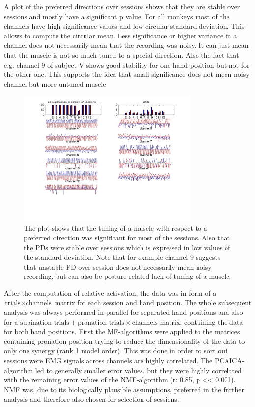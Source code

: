 A plot of the preferred directions over sessions shows that they are stable over sessions and mostly have a significant p value. For all monkeys most of the channels have high significance values and low circular standard deviation. This allows to compute the circular mean. Less significance or higher variance in a channel does not necessarily mean that the recording was noisy. It can just mean that the muscle is not so much tuned to a special direction. Also the fact that e.g. channel 9 of subject V shows good stability for one hand-position but not for the other one. This supports the idea that small significance does not mean noisy channel but more untuned muscle
\begin{figure}[ht]
    \centering
        \includegraphics[width=0.8\textwidth]{images/pd_consist_feather_allvega.jpg}
    \caption{The plot shows that the tuning of a muscle with respect to a preferred direction was significant for most of the sessions. Also that the PDs were stable over sessions which is expressed in low values of the standard deviation. Note that for example channel 9 suggests that unstable PD over session does not necessarily mean noisy recording, but can also be posture related lack of tuning of a muscle.}
    \label{sg:fig:images_pd_consist_feather_allvega}
\end{figure}


After the computation of relative activation, the data was in form of a $\text{trials} \times \text{channels}$ matrix for each session and hand position. The whole subsequent analysis was always performed in parallel for separated hand positions and also for a $\text{supination trials} + \text{pronation trials} \times \text{channels}$ matrix, containing the data for both hand positions. First the MF-algorithms were applied to the matrices containing pronation-position trying to reduce the dimensionality of the data to only one synergy (rank 1 model order). This was done in order to sort out sessions were EMG signals across channels are highly correlated. The PCAICA-algorithm led to generally smaller error values, but they were highly correlated with the remaining error values of the NMF-algorithm (r: 0.85, p << 0.001). NMF was, due to its biologically plausible assumptions, preferred in the further analysis and therefore also chosen for selection of sessions. 

